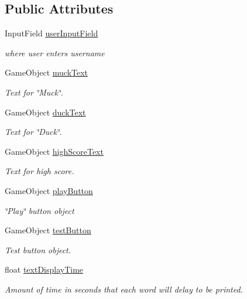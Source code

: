 \subsection*{Public Attributes}
\begin{DoxyCompactItemize}
\item 
Input\+Field \mbox{\hyperlink{class_main_menu_behavior_a377e447f108f5c58abc88de267d2f15a}{user\+Input\+Field}}
\begin{DoxyCompactList}\small\item\em where user enters username \end{DoxyCompactList}\item 
Game\+Object \mbox{\hyperlink{class_main_menu_behavior_afe8b2f04970ce8a3d136d1f99502c3bf}{muck\+Text}}
\begin{DoxyCompactList}\small\item\em Text for \char`\"{}\+Muck\char`\"{}. \end{DoxyCompactList}\item 
Game\+Object \mbox{\hyperlink{class_main_menu_behavior_aa835fb14615ed7f77fa0be1b65dc8509}{duck\+Text}}
\begin{DoxyCompactList}\small\item\em Text for \char`\"{}\+Duck\char`\"{}. \end{DoxyCompactList}\item 
Game\+Object \mbox{\hyperlink{class_main_menu_behavior_a702b34c8a43ff1226816a5d0336b2e21}{high\+Score\+Text}}
\begin{DoxyCompactList}\small\item\em Text for high score. \end{DoxyCompactList}\item 
Game\+Object \mbox{\hyperlink{class_main_menu_behavior_a64731257ca447074b47712040ea77a58}{play\+Button}}
\begin{DoxyCompactList}\small\item\em \char`\"{}\+Play\char`\"{} button object \end{DoxyCompactList}\item 
Game\+Object \mbox{\hyperlink{class_main_menu_behavior_ae2251a7587081d43d0063209576dbaff}{test\+Button}}
\begin{DoxyCompactList}\small\item\em Test button object. \end{DoxyCompactList}\item 
float \mbox{\hyperlink{class_main_menu_behavior_a688f08080926ec32f324c21da75a7771}{text\+Display\+Time}}
\begin{DoxyCompactList}\small\item\em Amount of time in seconds that each word will delay to be printed. \end{DoxyCompactList}\item 

\end{DoxyCompactItemize}
